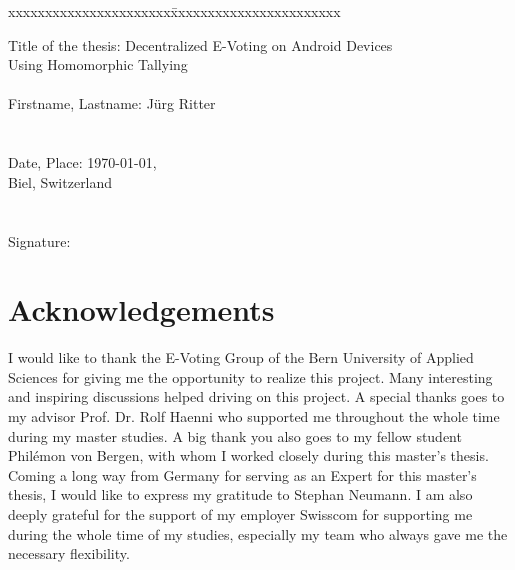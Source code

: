 \documentclass[numbers=noenddot, abstract=on, a4paper, headsepline,
footsepline, oneside, openright, draft=off, listof=leveldown]{scrreprt}
\begin{document}
\begin{flushleft}


\vspace{3.5cm}
\begin{tabbing}
xxxxxxxxxxxxxxxxxxxxxx\=xxxxxxxxxxxxxxxxxxxxxxx \kill

Title of the thesis:		\>  Decentralized E-Voting on Android Devices\\
 \> Using Homomorphic Tallying
\\
\\
Firstname, Lastname:		\>  Jürg Ritter		\\
\\
\\
Date, Place:		\> \today, \\
\>Biel, Switzerland			\\
\\
\\
Signature:
\end{tabbing}
\end{flushleft}

\tableofcontents
\listoffigures
\listoftables

\chapter*{Acknowledgements} I would like to thank the E-Voting Group of the Bern
University of Applied Sciences for giving me the opportunity to realize this
project. Many interesting and inspiring discussions helped driving on this
project. A special thanks goes to my advisor Prof. Dr. Rolf Haenni who supported
me throughout the whole time during my master studies. A big thank you also goes
to my fellow student Philémon von Bergen, with whom I worked closely during this
master's thesis. Coming a long way from Germany for serving as an Expert for
this master's thesis, I would like to express my gratitude to Stephan Neumann.
I am also deeply grateful for the support of my employer Swisscom for supporting
me during the whole time of my studies, especially my team who always gave me
the necessary flexibility.



\end{document}
